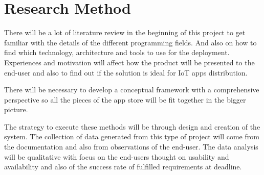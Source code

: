 \section{Research Method}

There will be a lot of literature review in the beginning of this project to get familiar with the details of the different programming fields. And also on how to find which technology, architecture and tools to use for the deployment. Experiences and motivation will affect how the product will be presented to the end-user and also to find out if the solution is ideal for IoT apps distribution.

There will be necessary to develop a conceptual framework with a comprehensive perspective so all the pieces of the app store will be fit together in the bigger picture.

The strategy to execute these methods will be through design and creation of the system. The collection of data generated from this type of project will come from the documentation and also from observations of the end-user. The data analysis will be qualitative with focus on the end-users thought on usability and availability and also of the success rate of fulfilled requirements at deadline.
